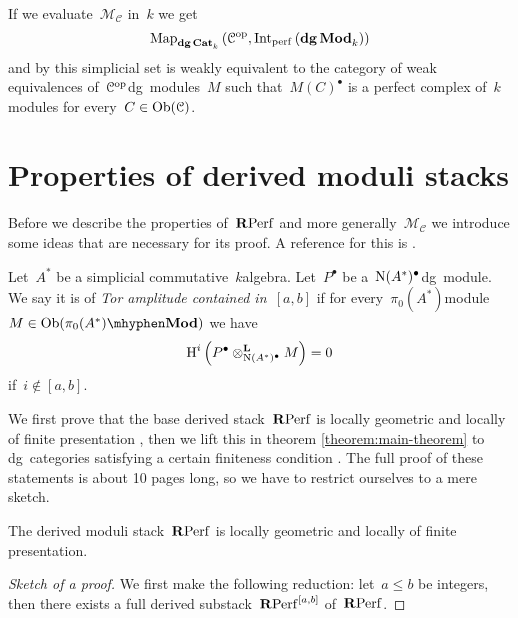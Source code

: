 \begin{refsection}
\begin{example}
  If we evaluate~$\mathcal{M}_{\mathcal{C}}$ in~$k$ we get
  \begin{equation}
    \Map_{\dgCat_k}\left( \mathcal{C}^\opp,\Int_\perf\left( \dgMod_k \right) \right)
  \end{equation}
  and by \cite{toen} this simplicial set is weakly equivalent to the category of weak equivalences of~$\mathcal{C}^{\mathrm{op}}$\dash dg~modules~$M$ such that~$M(C)^\bullet$ is a perfect complex of~$k$\dash modules for every~$C\in\operatorname{Ob}(\mathcal{C})$.
\end{example}


\section{Properties of derived moduli stacks}
\label{section:properties}
Before we describe the properties of~$\mathbf{R}\mathrm{Perf}$ and more generally~$\mathcal{M}_{\mathcal{C}}$ we introduce some ideas that are necessary for its proof. A reference for this is \cite[expos\'es I--III]{sga6}.
\begin{definition}
  Let~$A^*$ be a simplicial commutative~$k$\dash algebra. Let~$P^\bullet$ be a~$\operatorname{N}(A^*)^\bullet$\dash dg~module. We say it is of \emph{Tor amplitude contained in~$[a,b]$} if for every~$\pi_0(A^*)$\dash module~$M\in\Ob(\pi_0(A^*)\mhyphen\Mod)$ we have
  \begin{equation}
    \operatorname{H}^i\left( P^\bullet\otimes_{\operatorname{N}(A^*)^\bullet}^{\mathbf{L}} M \right)=0
  \end{equation}
  if~$i\notin[a,b]$.
\end{definition}

We first prove that the base derived stack~$\mathbf{R}\mathrm{Perf}$ is locally geometric and locally of finite presentation \cite[proposition 3.7]{toen-vaquie}, then we lift this in theorem \ref{theorem:main-theorem} to dg~categories satisfying a certain finiteness condition \cite[theorem 3.6]{toen-vaquie}. The full proof of these statements is about 10 pages long, so we have to restrict ourselves to a mere sketch.
\begin{theorem}
  \label{theorem:main-theorem-RPerf}
  The derived moduli stack~$\mathbf{R}\mathrm{Perf}$ is locally geometric and locally of finite presentation.

  \begin{proof}[Sketch of a proof]
    We first make the following reduction: let~$a\leq b$ be integers, then there exists a full derived substack~$\mathbf{R}\mathrm{Perf}^{[a,b]}$ of~$\mathbf{R}\mathrm{Perf}$.
    

\end{proof}
\end{theorem}
\end{refsection}
